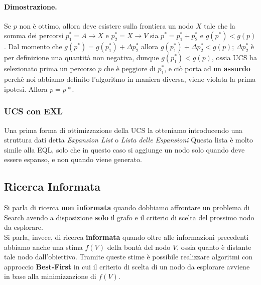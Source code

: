 \paragraph{Dimostrazione. }
Se $p$ non è ottimo, allora deve esistere sulla frontiera un nodo $X$ tale che la somma dei percorsi $p_1^* = A \longrightarrow X$ e $p_2^* = X \longrightarrow V$ sia $p^* = p_1^* + p_2^*$ e $g(p^*) < g(p)$.
Dal momento che $g(p^*) = g(p_1^*) + \Delta p_2^*$ allora $ g(p_1^*) + \Delta p_2^* < g(p)$; $\Delta p_2^*$ è per definizione una quantità non negativa,
dunque $g(p_1^*) < g(p)$, ossia UCS ha selezionato prima un percorso $p$ che è peggiore di $p_1^*$, e ciò porta ad un \textbf{assurdo} perchè noi
abbiamo definito l'algoritmo in maniera diversa, viene violata la prima ipotesi. Allora $p = p*$.


\begin{center}
\end{center}



\subsubsection{UCS con EXL}
Una prima forma di ottimizzazione della UCS la otteniamo introducendo una struttura dati detta \textit{Expansion List} o \textit{Lista delle Espansioni}
Questa lista è molto simile alla EQL, solo che in questo caso si aggiunge un nodo solo quando deve essere espanso, e non quando viene generato.



\subsection{Ricerca Informata}
Si parla di ricerca \textbf{non informata} quando dobbiamo affrontare un problema di Search avendo a disposizione \textbf{solo} 
il grafo e il criterio di scelta del prossimo nodo da esplorare.\\
Si parla, invece, di ricerca \textbf{informata} quando oltre alle informazioni precedenti abbiamo anche una stima $f(V)$ della bontà
del nodo $V$, ossia quanto è distante tale nodo dall'obiettivo. Tramite queste stime è possibile realizzare algoritmi con approccio
\textbf{Best-First} in cui il criterio di scelta di un nodo da esplorare avviene in base alla minimizzazione di $f(V)$.

